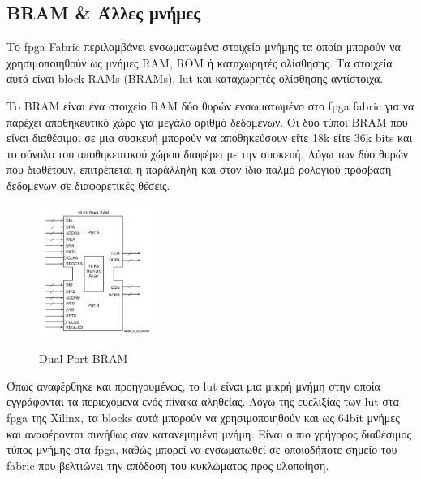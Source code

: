 \subsection{BRAM \& Άλλες μνήμες}

Το \gls{fpga} Fabric περιλαμβάνει ενσωματωμένα στοιχεία μνήμης τα οποία μπορούν να χρησιμοποιηθούν ως μνήμες RAM, ROM ή καταχωρητές ολίσθησης. Τα στοιχεία αυτά είναι block RAMs (BRAMs), \gls{lut} και καταχωρητές ολίσθησης αντίστοιχα.

Τo BRAM είναι ένα στοιχείο RAM δύο θυρών ενσωματωμένο στο \gls{fpga} fabric για να παρέχει αποθηκευτικό χώρο για μεγάλο αριθμό δεδομένων. Οι δύο τύποι BRAM που είναι διαθέσιμοι σε μια συσκευή μπορούν να αποθηκεύσουν είτε 18k είτε 36k bits και το σύνολο του αποθηκευτικού χώρου διαφέρει με την συσκευή. Λόγω των δύο θυρών που διαθέτουν, επιτρέπεται η παράλληλη και στον ίδιο παλμό ρολογιού πρόσβαση δεδομένων σε διαφορετικές θέσεις.
\begin{figure}[ht]
  	\centering
	\includegraphics[width=0.35\textwidth]{images/bram}\\
	\caption{Dual Port BRAM \cite{bram}}
\end{figure}

Όπως αναφέρθηκε και προηγουμένως, το \gls{lut} είναι μια μικρή μνήμη στην οποία εγγράφονται τα περιεχόμενα ενός πίνακα αληθείας. Λόγω της ευελιξίας των \gls{lut} στα \gls{fpga} της Xilinx, τα blocks αυτά μπορούν να χρησιμοποιηθούν και ως 64bit μνήμες και αναφέρονται συνήθως σαν κατανεμημένη μνήμη. Είναι ο πιο γρήγορος διαθέσιμος τύπος μνήμης στα \gls{fpga}, καθώς μπορεί να ενσωματωθεί σε οποιοδήποτε σημείο του fabric που βελτιώνει την απόδοση του κυκλώματος προς υλοποίηση.

